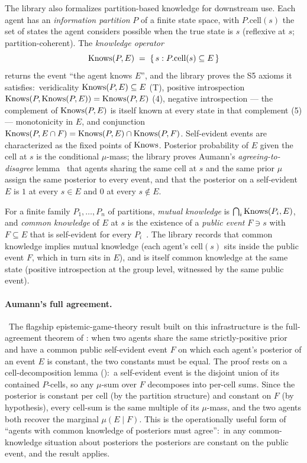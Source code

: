 The library also formalizes partition-based knowledge for downstream
use.  Each agent has an
\emph{information partition} $P$ of a finite state space, with
$P.\mathrm{cell}(s)$ the set of states the agent considers possible
when the true state is $s$ (reflexive at $s$; partition-coherent).
The \emph{knowledge
operator}
\[
  \mathrm{Knows}(P, E) \;=\; \{\,s : P.\mathrm{cell}(s) \subseteq E\,\}
\]
returns the event ``the agent knows $E$'', and the library proves
the S5 axioms it satisfies:\ veridicality $\mathrm{Knows}(P, E) \subseteq
E$ (T), positive introspection $\mathrm{Knows}(P, \mathrm{Knows}(P, E)) = \mathrm{Knows}(P,
E)$ (4), negative introspection — the complement of $\mathrm{Knows}(P, E)$
is itself known at every state in that complement (5) —
monotonicity in $E$, and conjunction $\mathrm{Knows}(P, E \cap F) =
\mathrm{Knows}(P, E) \cap \mathrm{Knows}(P, F)$.  Self-evident events are
characterized as the fixed points of $\mathrm{Knows}$.  Posterior
probability of $E$ given the cell at $s$ is the conditional
$\mu$-mass; the library proves Aumann's \emph{agreeing-to-disagree}
lemma~\citep{Aumann1976} that agents sharing the same cell at $s$
and the same prior $\mu$ assign the same posterior to every event,
and that the posterior on a self-evident $E$ is $1$ at every $s \in
E$ and $0$ at every $s \notin E$.

For a finite family $P_1, \dots, P_n$ of partitions,
\emph{mutual knowledge} is $\bigcap_i \mathrm{Knows}(P_i, E)$, and
\emph{common knowledge} of $E$ at $s$ is the existence of a
\emph{public event} $F \ni s$ with $F \subseteq E$ that is
self-evident for every $P_i$~\citep{Aumann1976}.  The library
records that common knowledge implies mutual knowledge (each
agent's $\mathrm{cell}(s)$ sits inside the public event $F$, which
in turn sits in $E$), and is itself common knowledge at the same
state (positive introspection at the group level, witnessed by the
same public event).

\paragraph{Aumann's full agreement.}\
The flagship epistemic-game-theory result built on this
infrastructure is the full-agreement theorem of \citet{Aumann1976}:
when two agents
share the same strictly-positive prior and have a common public
self-evident event $F$ on which each agent's posterior of an event
$E$ is constant, the two constants must be equal. The proof rests
on a cell-decomposition lemma (\TT{selfEvident\_sum\_decomp}):\
a self-evident event is the disjoint union of its contained
$P$-cells, so any $\mu$-sum over $F$ decomposes into per-cell
sums. Since the posterior is constant per cell (by the partition
structure) and constant on $F$ (by hypothesis), every cell-sum is
the same multiple of its $\mu$-mass, and the two agents both
recover the marginal $\mu(E \mid F)$. This is the operationally
useful form of ``agents with common knowledge of posteriors must
agree'':\ in any common-knowledge situation about posteriors the
posteriors are constant on the public event, and the result
applies.

